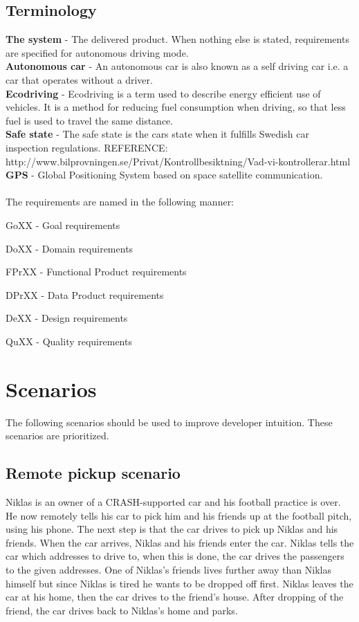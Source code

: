 \documentclass{article}
\begin{document}
\subsection{Terminology}
\textbf{The system} - The delivered product. When nothing else is stated, requirements are specified for autonomous driving mode.\\
\textbf{Autonomous car} - An autonomous car is also known as a self driving car i.e. a car that operates without a driver. \\
\textbf{Ecodriving} - Ecodriving is a term used to describe energy efficient use of vehicles. It is a method for reducing fuel consumption when driving, so that less fuel is used to travel the same distance.\\
\textbf{Safe state} - The safe state is the cars state when it fulfills Swedish car inspection regulations.
REFERENCE: http://www.bilprovningen.se/Privat/Kontrollbesiktning/Vad-vi-kontrollerar.html\\
\textbf{GPS} - Global Positioning System based on space satellite communication.\\
\\
The requirements are named in the following manner:
\begin{description*}
\item[GoXX] - Goal requirements 
\item[DoXX] - Domain requirements 
\item[FPrXX] - Functional Product requirements 
\item[DPrXX] - Data Product requirements 
\item[DeXX] - Design requirements 
\item[QuXX] - Quality requirements 
\end{description*}
\medskip


\section{Scenarios}
The following scenarios should be used to improve developer intuition. These scenarios are prioritized.
\subsection {Remote pickup scenario}
Niklas is an owner of a CRASH-supported car and his football practice is over. He now remotely tells his car to pick him and his friends up at the football pitch, using his phone. The next step is that the car drives to pick up Niklas and his friends. When the car arrives, Niklas and his friends enter the car. Niklas tells the car which addresses to drive to, when this is done, the car drives the passengers to the given addresses. One of Niklas's friends lives further away than Niklas himself but since Niklas is tired he wants to be dropped off first. Niklas leaves the car at his home, then the car drives to the friend's house. After dropping of the friend, the car drives back to Niklas's home and parks.
\end{document}
